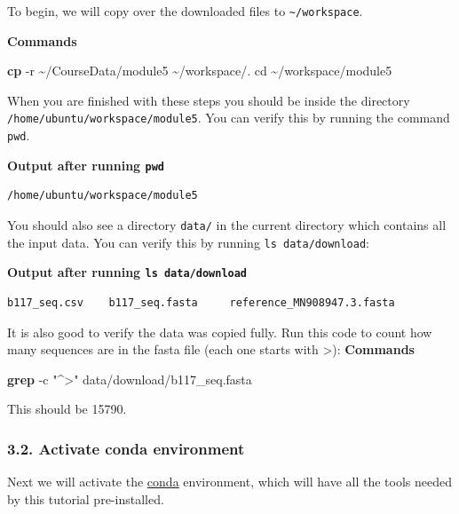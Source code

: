 \documentclass[
]{book}
\newenvironment{Shaded}{\begin{snugshade}}{\end{snugshade}}
\newcommand{\AttributeTok}[1]{\textcolor[rgb]{0.13,0.29,0.53}{#1}}
\newcommand{\BuiltInTok}[1]{#1}
\newcommand{\FunctionTok}[1]{\textcolor[rgb]{0.13,0.29,0.53}{\textbf{#1}}}
\newcommand{\NormalTok}[1]{#1}
\newcommand{\StringTok}[1]{\textcolor[rgb]{0.31,0.60,0.02}{#1}}
\begin{document}
To begin, we will copy over the downloaded files to \texttt{\textasciitilde{}/workspace}.

\textbf{Commands}

\begin{Shaded}
\begin{Highlighting}[]
\FunctionTok{cp} \AttributeTok{{-}r}\NormalTok{ \textasciitilde{}/CourseData/module5 \textasciitilde{}/workspace/.}
\BuiltInTok{cd}\NormalTok{ \textasciitilde{}/workspace/module5}
\end{Highlighting}
\end{Shaded}

When you are finished with these steps you should be inside the directory \texttt{/home/ubuntu/workspace/module5}. You can verify this by running the command \texttt{pwd}.

\textbf{Output after running \texttt{pwd}}

\begin{verbatim}
/home/ubuntu/workspace/module5
\end{verbatim}

You should also see a directory \texttt{data/} in the current directory which contains all the input data. You can verify this by running \texttt{ls\ data/download}:

\textbf{Output after running \texttt{ls\ data/download}}

\begin{verbatim}
b117_seq.csv    b117_seq.fasta     reference_MN908947.3.fasta 
\end{verbatim}

It is also good to verify the data was copied fully. Run this code to count how many sequences are in the fasta file (each one starts with \textgreater):
\textbf{Commands}

\begin{Shaded}
\begin{Highlighting}[]
\FunctionTok{grep} \AttributeTok{{-}c} \StringTok{"\^{}\textgreater{}"}\NormalTok{ data/download/b117\_seq.fasta }
\end{Highlighting}
\end{Shaded}

This should be 15790.

\subsubsection{3.2. Activate conda environment}\label{activate-conda-environment}

Next we will activate the \href{https://docs.conda.io/en/latest/}{conda} environment, which will have all the tools needed by this tutorial pre-installed.
\end{document}
